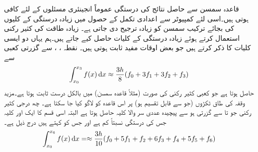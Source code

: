 قاعدہ سمسن  سے حاصل نتائج کی درستگی عموماً انجینئری مسئلوں کے لئے کافی ہوتی ہیں۔اسی لئے کمپیوٹر سے اعدادی تکمل کے حصول میں زیادہ درستگی کے کلیوں کی بجائے  ترکیب سمسن  کو زیادہ ترجیح دی جاتی ہے۔ زیادہ طاقت کی کثیر رکنی استعمال کرتے ہوئے زیادہ درستگی کے کلیات حاصل کیے جاتے ہیں۔ہم یہاں دو ایسی کلیات کا ذکر کرتے ہیں جو بعض اوقات مفید ثابت ہوتی ہیں۔ نقطہ ، ،  سے گزرتی کعبی سے  
\begin{align}\label{مساوات_اعدادی_آٹھ_میں_تین_قاعدہ}
\int_{x_0}^{x_3} f(x)\dif x\approx \frac{3h}{8}(f_0+3f_1+3f_2+f_3)
\end{align}
حاصل ہوتا ہے جو کعبی کثیر رکنی کی صورت (مثلاً قاعدہ سمسن) میں بالکل درست ثابت ہوتا ہے۔مزید  وقفہ کی طاق ٹکڑوں (جو  سے قابل تقسیم ہو) پر اس قاعدہ کو لاگو کیا جا سکتا ہے۔ چھ درجی کثیر رکنی جو  تا  سے گزرتی ہو سے  پیچیدہ عددی سر والا کلیہ حاصل ہوتا ہے البتہ اسی قسم کا ایک اور کلیہ جس کی درستگی نسبتاً کم ہے اور جس  کو  کہتے ہیں درج ذیل ہے۔
\begin{align}\label{مساوات_اعدادی_ویڈل_قاعدہ}
\int_{x_0}^{x_6} f(x)\dif x=\approx \frac{3h}{10}(f_0+5f_1+f_2+6f_3+f_4+5f_5+f_6)
\end{align}

